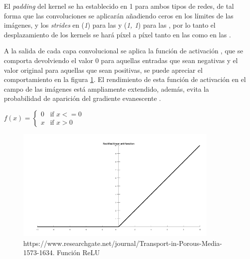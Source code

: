 \begin{enumerate}
                El \textit{padding} del kernel se ha establecido en 1 para ambos tipos de redes, de tal forma que las convoluciones se aplicarán añadiendo ceros en los límites de las imágenes, y los \textit{strides} en (\textit{1}) para las  y (\textit{1, 1}) para las , por lo tanto el desplazamiento de los kernels se hará píxel a píxel tanto en las  como en las .

                A la salida de cada capa convolucional se aplica la función de activación , que se comporta devolviendo el valor $0$ para aquellas entradas que sean negativas y el valor original para aquellas que sean positivas, se puede apreciar el comportamiento en la figura \ref{RELUImage}. El rendimiento de esta función de activación en el campo de las imágenes está ampliamente extendido, además, evita la probabilidad de aparición del gradiente evanescente \cite{GradientVanishingRelu}.

                \begin{center}
                    $f(x) = \left\{
                                   \begin{array}{lr}
                                     0 & \text{if } x<=0\\
                                     x & \text{if } x>0
                                   \end{array}
                            \right.$
                \end{center}

                \begin{figure}[h]
                    \centering
                    \includegraphics[width=10cm]{archivos/4.Metodologia/Modelos/CNN/RELUImage}
                    \caption{https://www.researchgate.net/journal/Transport-in-Porous-Media-1573-1634. Función ReLU}
                    \label{RELUImage}
                 \end{figure}


\end{enumerate}

